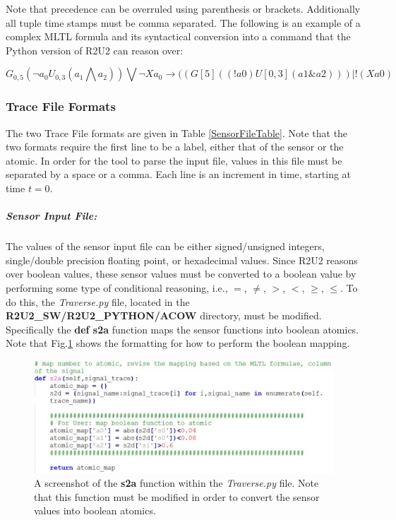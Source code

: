 Note that precedence can be overruled using parenthesis or brackets. Additionally all tuple time stamps must be comma separated. The following is an example of a complex MLTL formula and its syntactical conversion into a command that the Python version of R2U2 can reason over:

\begin{equation}
G_{0,5}(\neg{a_0}U_{0,3} (a_1 \bigwedge a_2)) \bigvee \neg{Xa_0} \rightarrow ((G[5] ((!a0) U[0,3] (a1 \& a2))) | !(Xa0)
\label{ExampleMLTL}
\end{equation}

\subsubsection{Trace File Formats}
\label{TraceFiles}
The two Trace File formats are given in Table \ref{SensorFileTable}. Note that the two formats require the first line to be a label, either that of the sensor or the atomic. In order for the tool to parse the input file,  values in this file must be separated by a space or a comma. Each line is an increment in time, starting at time $t=0$.

\subparagraph{Sensor Input File:}
\label{SensorInputFile}
The values of the sensor input file can be either signed/unsigned integers, single/double precision floating point, or hexadecimal values. Since R2U2 reasons over boolean values, these sensor values must be converted to a boolean value by performing some type of conditional reasoning, i.e., $=$, $\neq$, $>$, $<$, $\geq$, $\leq$. To do this, the \textit{Traverse.py} file, located in the \textbf{R2U2\_SW/R2U2\_PYTHON/ACOW} directory, must be modified. Specifically the \textbf{def s2a} function maps the sensor functions into boolean atomics. Note that Fig.\ref{fig:sa} shows the formatting for how to perform the boolean mapping.
\begin{center}
	\begin{figure}[H]
		\includegraphics[scale=0.5]{fig/TraverseScreenshot.pdf}
		\caption{A screenshot of the \textbf{s2a} function within the \textit{Traverse.py} file. Note that this function must be modified in order to convert the sensor values into boolean atomics.}
		\label{fig:sa}
	\end{figure}
\end{center}

